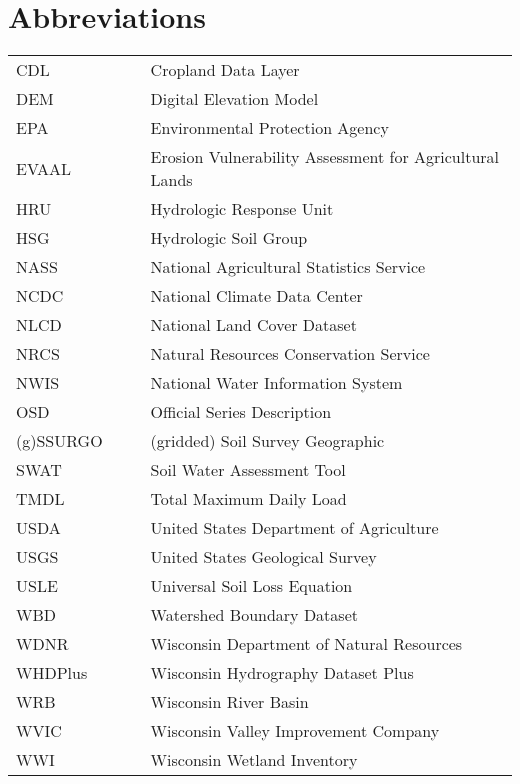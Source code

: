 \section*{Abbreviations}

\begin{tabular}{l c c l}

CDL		&	& &	Cropland Data Layer				\\
DEM		&	& &	Digital Elevation Model			\\
EPA		&	& &	Environmental Protection Agency	\\
EVAAL	&	& & Erosion Vulnerability Assessment for Agricultural Lands \\
HRU 	& 	& &	Hydrologic Response Unit 		\\
HSG		&	& &	Hydrologic Soil Group			\\
NASS	&	& &	National Agricultural Statistics Service \\
NCDC	&	& &	National Climate Data Center \\
NLCD	&	& &	National Land Cover Dataset	\\
NRCS	& 	& &	Natural Resources Conservation Service \\
NWIS	&	& &	National Water Information System \\
OSD		&	& &	Official Series Description \\
(g)SSURGO	& & &	(gridded) Soil Survey Geographic \\
SWAT 	& 	& &	Soil Water Assessment Tool 		\\
TMDL	&	& &	Total Maximum Daily Load		\\
USDA	&	& &	United States Department of Agriculture\\
USGS 	&	& &	United States Geological Survey \\
USLE	&	& &	Universal Soil Loss Equation	\\
WBD		&	& &	Watershed Boundary Dataset		\\
WDNR	&	& &	Wisconsin Department of Natural Resources \\
WHDPlus	&	& &	Wisconsin Hydrography Dataset Plus \\
WRB		&	& &	Wisconsin River Basin			\\
WVIC	&	& &	Wisconsin Valley Improvement Company \\
WWI		&	& &	Wisconsin Wetland Inventory		\\
\end{tabular}

\clearpage